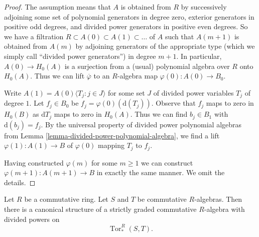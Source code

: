 \begin{proof}
The assumption means that $A$ is obtained from $R$ by successively adjoining
some set of polynomial generators in degree zero, exterior generators
in positive odd degrees, and divided power generators
in positive even degrees. So we have a filtration
$R \subset A(0) \subset A(1) \subset \ldots$
of $A$ such that $A(m + 1)$ is obtained from $A(m)$ by adjoining
generators of the appropriate type (which we simply call
``divided power generators'') in degree $m + 1$.
In particular, $A(0) \to H_0(A)$ is a surjection from a (usual) polynomial
algebra over $R$ onto $H_0(A)$. Thus we can lift $\overline{\varphi}$
to an $R$-algebra map $\varphi(0) : A(0) \to B_0$.

\medskip\noindent
Write $A(1) = A(0)\langle T_j:j\in J\rangle$ for some
set $J$ of divided power variables $T_j$ of degree $1$. Let $f_j \in B_0$
be $f_j = \varphi(0)(\text{d}(T_j))$. Observe that $f_j$
maps to zero in $H_0(B)$ as $\text{d}T_j$ maps to zero in $H_0(A)$.
Thus we can find $b_j \in B_1$ with $\text{d}(b_j) = f_j$.
By the universal property of divided power polynomial algebras from
Lemma \ref{lemma-divided-power-polynomial-algebra},
we find a lift $\varphi(1) : A(1) \to B$ of $\varphi(0)$
mapping $T_j$ to $f_j$.

\medskip\noindent
Having constructed $\varphi(m)$ for some $m \geq 1$ we can construct
$\varphi(m + 1) : A(m + 1) \to B$ in exactly the same manner.
We omit the details.
\end{proof}

\begin{lemma}
\label{lemma-divided-powers-on-tor}
Let $R$ be a commutative ring. Let $S$ and $T$ be commutative $R$-algebras.
Then there is a canonical structure
of a strictly graded commutative $R$-algebra with divided powers on
$$
\operatorname{Tor}_*^R(S, T).
$$
\end{lemma}

